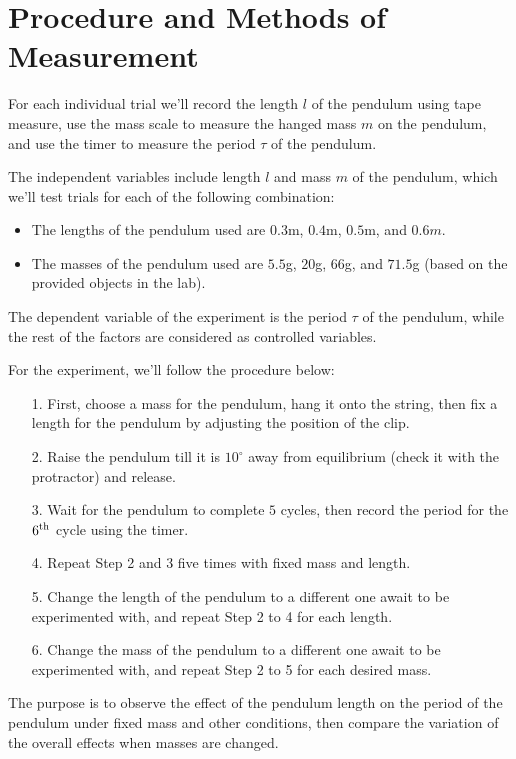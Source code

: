 \documentclass{article}
\begin{document}
\pagebreak

\section{Procedure and Methods of Measurement}
For each individual trial we'll record the length $l$ of the pendulum using tape measure, use the mass scale to measure the hanged mass $m$ on the pendulum, and use the timer to measure the period $\tau$ of the pendulum.

The independent variables include length $l$ and mass $m$ of the pendulum, which we'll test trials for each of the following combination:
\begin{itemize}
    \item The lengths of the pendulum used are $0.3$m, $0.4$m, $0.5$m, and $0.6m$. 
    \item The masses of the pendulum used are $5.5$g, $20$g, $66$g, and $71.5$g (based on the provided objects in the lab). 
\end{itemize}
The dependent variable of the experiment is the period $\tau$ of the pendulum, while the rest of the factors are considered as controlled variables.

For the experiment, we'll follow the procedure below:
\begin{itemize}
    \item[1.] First, choose a mass for the pendulum, hang it onto the string, then fix a length for the pendulum by adjusting the position of the clip.
    \item[2.] Raise the pendulum till it is $10^\circ$ away from equilibrium (check it with the protractor) and release.
    \item[3.] Wait for the pendulum to complete $5$ cycles, then record the period for the $6^\textmd{th}$ cycle using the timer.
    \item[4.] Repeat Step 2 and 3 five times with fixed mass and length.
    \item[5.] Change the length of the pendulum to a different one await to be experimented with, and repeat Step 2 to 4 for each length.
    \item[6.] Change the mass of the pendulum to a different one await to be experimented with, and repeat Step 2 to 5 for each desired mass.
\end{itemize}
The purpose is to observe the effect of the pendulum length on the period of the pendulum under fixed mass and other conditions, then compare the variation of the overall effects when masses are changed.
\end{document}
